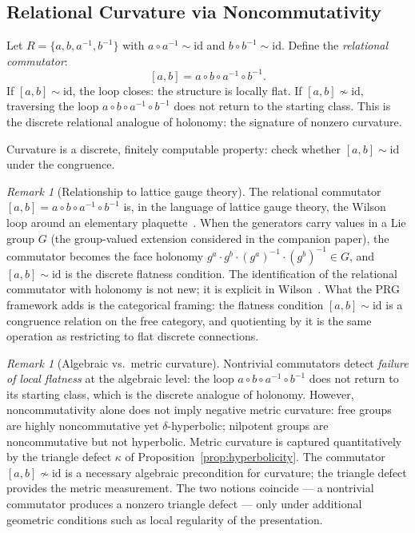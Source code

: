 \documentclass{article}
\theoremstyle{definition}
\theoremstyle{remark}
\newtheorem{remark}[theorem]{Remark}
\newcommand{\id}{\mathrm{id}}
\begin{document}
\subsection{Relational Curvature via Noncommutativity}
\label{sec:curvature}

Let $R = \{a, b, a^{-1}, b^{-1}\}$ with
$a \circ a^{-1} \sim \id$ and $b \circ b^{-1} \sim \id$.
Define the \emph{relational commutator}:
\[
  [a,b] = a \circ b \circ a^{-1} \circ b^{-1}.
\]
If $[a,b] \sim \id$, the loop closes: the structure is locally
flat. If $[a,b] \not\sim \id$, traversing the loop
$a \circ b \circ a^{-1} \circ b^{-1}$ does not return to the
starting class. This is the discrete relational analogue of
holonomy: the signature of nonzero curvature.

Curvature is a discrete, finitely computable property: check
whether $[a,b] \sim \id$ under the congruence.

\begin{remark}[Relationship to lattice gauge theory]
\label{rem:wilson}
The relational commutator $[a,b] = a \circ b \circ a^{-1}
\circ b^{-1}$ is, in the language of lattice gauge theory, the
Wilson loop around an elementary plaquette~\cite{wilson74}. When
the generators carry values in a Lie group $G$ (the group-valued
extension considered in the companion paper), the commutator
becomes the face holonomy $g^a \cdot g^b \cdot (g^a)^{-1} \cdot
(g^b)^{-1} \in G$, and $[a,b] \sim \id$ is the discrete flatness
condition. The identification of the relational commutator with
holonomy is not new; it is explicit in Wilson~\cite{wilson74}.
What the PRG framework adds is the categorical framing: the
flatness condition $[a,b] \sim \id$ is a congruence relation on
the free category, and quotienting by it is the same operation as
restricting to flat discrete connections.
\end{remark}

\begin{remark}[Algebraic vs.\ metric curvature]
\label{rem:curvature_gap}
Nontrivial commutators detect \emph{failure of local flatness}
at the algebraic level: the loop $a \circ b \circ a^{-1} \circ
b^{-1}$ does not return to its starting class, which is the
discrete analogue of holonomy. However, noncommutativity alone
does not imply negative metric curvature: free groups are highly
noncommutative yet $\delta$-hyperbolic; nilpotent groups are
noncommutative but not hyperbolic. Metric curvature is captured
quantitatively by the triangle defect $\kappa$ of
Proposition~\ref{prop:hyperbolicity}. The commutator
$[a,b] \not\sim \id$ is a necessary algebraic precondition for
curvature; the triangle defect provides the metric measurement.
The two notions coincide --- a nontrivial commutator produces a
nonzero triangle defect --- only under additional geometric
conditions such as local regularity of the presentation.
\end{remark}
\end{document}
